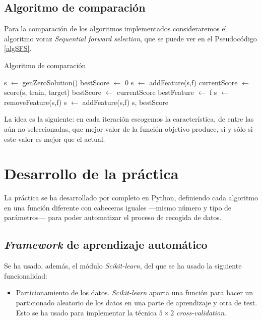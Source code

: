 \documentclass[a4paper, 11pt, titlepage]{article}
\begin{document}
    \subsection{Algoritmo de comparación}

    Para la comparación de los algoritmos implementados consideraremos el algoritmo voraz \emph{Sequential forward selection}, que se puede ver en el Pseudocódigo \ref{algSFS}.

    \begin{algorithm}
        \caption{Algoritmo de comparación}\label{algSFS}
        \begin{algorithmic}[1]
            \State s $\gets$ genZeroSolution()
            \State bestScore $\gets$ 0
                    \State s $\gets$ addFeature(s,f)
                    \State currentScore $\gets$ score(s, train, target)
                    \State bestScore $\gets$ currentScore
                    \State bestFeature $\gets$ f
                    \EndIf
                    \State s $\gets$ removeFeature(s,f)
                \EndFor
            \State s $\gets$ addFeature(s,f)
            \EndIf
            \EndWhile
            \State \Return s, bestScore
            \EndFunction
        \end{algorithmic}
    \end{algorithm}

    La idea es la siguiente: en cada iteración escogemos la característica, de entre las aún no seleccionadas, que mejor valor de la función objetivo produce, si y sólo si este valor es mejor que el actual.

    \section{Desarrollo de la práctica}

    La práctica se ha desarrollado por completo en Python, definiendo cada algoritmo en una función diferente con cabeceras iguales ---mismo número y tipo de parámetros--- para poder automatizar el proceso de recogida de datos.

    \subsection{\emph{Framework} de aprendizaje automático}
    Se ha usado, además, el módulo \emph{Scikit-learn}, del que se ha usado la siguiente funcionalidad:
    \begin{itemize}
        \item Particionamiento de los datos. \emph{Scikit-learn} aporta una función para hacer un particionado aleatorio de los datos en una parte de aprendizaje y otra de test. Esto se ha usado para implementar la técnica $5\times2$ \emph{cross-validation}.
    \end{itemize}
\end{document}
